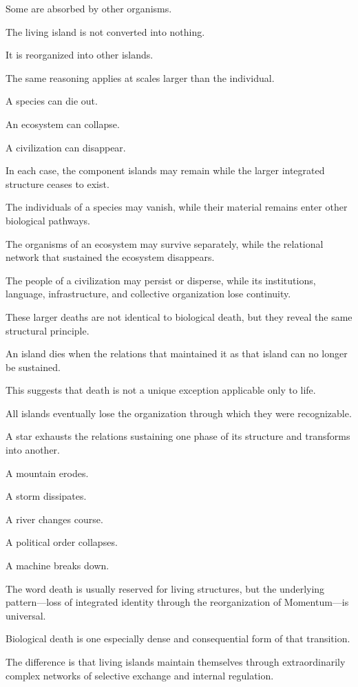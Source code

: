 Some are absorbed by other organisms.

The living island is not converted into nothing.

It is reorganized into other islands.

The same reasoning applies at scales larger than the individual.

A species can die out.

An ecosystem can collapse.

A civilization can disappear.

In each case, the component islands may remain while the larger integrated structure ceases to exist.

The individuals of a species may vanish, while their material remains enter other biological pathways.

The organisms of an ecosystem may survive separately, while the relational network that sustained the ecosystem disappears.

The people of a civilization may persist or disperse, while its institutions, language, infrastructure, and collective organization lose continuity.

These larger deaths are not identical to biological death, but they reveal the same structural principle.

An island dies when the relations that maintained it as that island can no longer be sustained.

This suggests that death is not a unique exception applicable only to life.

All islands eventually lose the organization through which they were recognizable.

A star exhausts the relations sustaining one phase of its structure and transforms into another.

A mountain erodes.

A storm dissipates.

A river changes course.

A political order collapses.

A machine breaks down.

The word death is usually reserved for living structures, but the underlying pattern—loss of integrated identity through the reorganization of Momentum—is universal.

Biological death is one especially dense and consequential form of that transition.

The difference is that living islands maintain themselves through extraordinarily complex networks of selective exchange and internal regulation.

